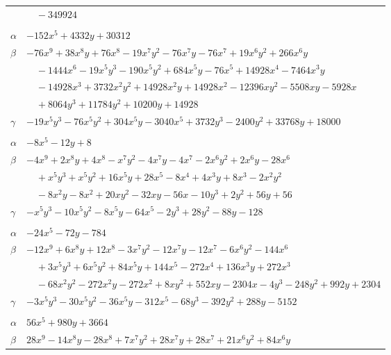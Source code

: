 \documentclass[11pt]{article}
\begin{document}
\begin{longtable}{@{}ll@{}}
 & $\quad -349924$\\
\addlinespace[3pt]
\multicolumn{2}{@{}l}{$\{i,j\}=\{17,22\}$, $k_{ij}=2^{8}\cdot 3\cdot 7\cdot 17$}\\
$\alpha$ & $-152x^{5}+4332y+30312$\\
$\beta$ & $-76x^{9}+38x^{8}y+76x^{8}-19x^{7}y^{2}-76x^{7}y-76x^{7}+19x^{6}y^{2}+266x^{6}y$\\
 & $\quad -1444x^{6}-19x^{5}y^{3}-190x^{5}y^{2}+684x^{5}y-76x^{5}+14928x^{4}-7464x^{3}y$\\
 & $\quad -14928x^{3}+3732x^{2}y^{2}+14928x^{2}y+14928x^{2}-12396xy^{2}-5508xy-5928x$\\
 & $\quad +8064y^{3}+11784y^{2}+10200y+14928$\\
$\gamma$ & $-19x^{5}y^{3}-76x^{5}y^{2}+304x^{5}y-3040x^{5}+3732y^{3}-2400y^{2}+33768y+18000$\\
\addlinespace[3pt]
\multicolumn{2}{@{}l}{$\{i,j\}=\{17,23\}$, $k_{ij}=2^{4}\cdot 3$}\\
$\alpha$ & $-8x^{5}-12y+8$\\
$\beta$ & $-4x^{9}+2x^{8}y+4x^{8}-x^{7}y^{2}-4x^{7}y-4x^{7}-2x^{6}y^{2}+2x^{6}y-28x^{6}$\\
 & $\quad +x^{5}y^{3}+x^{5}y^{2}+16x^{5}y+28x^{5}-8x^{4}+4x^{3}y+8x^{3}-2x^{2}y^{2}$\\
 & $\quad -8x^{2}y-8x^{2}+20xy^{2}-32xy-56x-10y^{3}+2y^{2}+56y+56$\\
$\gamma$ & $-x^{5}y^{3}-10x^{5}y^{2}-8x^{5}y-64x^{5}-2y^{3}+28y^{2}-88y-128$\\
\addlinespace[3pt]
\multicolumn{2}{@{}l}{$\{i,j\}=\{17,30\}$, $k_{ij}=2^{9}\cdot 5$}\\
$\alpha$ & $-24x^{5}-72y-784$\\
$\beta$ & $-12x^{9}+6x^{8}y+12x^{8}-3x^{7}y^{2}-12x^{7}y-12x^{7}-6x^{6}y^{2}-144x^{6}$\\
 & $\quad +3x^{5}y^{3}+6x^{5}y^{2}+84x^{5}y+144x^{5}-272x^{4}+136x^{3}y+272x^{3}$\\
 & $\quad -68x^{2}y^{2}-272x^{2}y-272x^{2}+8xy^{2}+552xy-2304x-4y^{3}-248y^{2}+992y+2304$\\
$\gamma$ & $-3x^{5}y^{3}-30x^{5}y^{2}-36x^{5}y-312x^{5}-68y^{3}-392y^{2}+288y-5152$\\
\addlinespace[3pt]
\multicolumn{2}{@{}l}{$\{i,j\}=\{17,32\}$, $k_{ij}=2^{5}\cdot 5^{3}$}\\
$\alpha$ & $56x^{5}+980y+3664$\\
$\beta$ & $28x^{9}-14x^{8}y-28x^{8}+7x^{7}y^{2}+28x^{7}y+28x^{7}+21x^{6}y^{2}+84x^{6}y$\\

\end{longtable}
\end{document}
